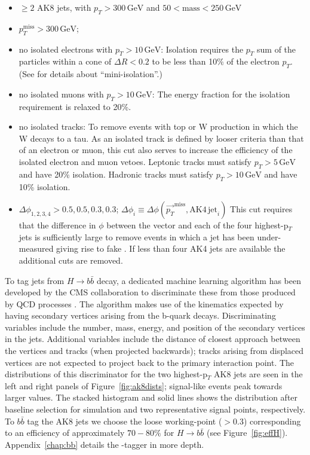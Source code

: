 \begin{itemize}
\item $\geq2$ AK8 jets, with $p_{T} > 300\,\mathrm{GeV}$ and $50 < \mathrm{mass} < 250\,\mathrm{GeV}$
\item $p_{T}^{\mathrm{miss}} > 300\,\mathrm{GeV}$;
\item no isolated electrons with $p_{T}>10\,\textrm{GeV}$:\newline
Isolation requires the $p_{T}$ sum of the particles within a cone of $\Delta R < 0.2$ to be less than 10\% of the electron $p_{T}$. (See \cite{miniiso} for details about ``mini-isolation''.)
\item no isolated muons with $p_{T}>10\,\textrm{GeV}$:\newline
The energy fraction for the isolation requirement is relaxed to 20\%.
\item no isolated tracks:\newline
To remove events with top or W production in which the W decays to a tau. As an isolated track is defined by looser criteria than that of an electron or muon, this cut also serves to increase the efficiency of the isolated electron and muon vetoes. Leptonic tracks must satisfy $p_{T}>5\,\textrm{GeV}$ and have 20\% isolation. Hadronic tracks must satisfy $p_{T}>10\,\textrm{GeV}$ and have 10\% isolation.
\item $\Delta\phi_{1, 2, 3, 4} > 0.5, 0.5, 0.3, 0.3$; $\Delta\phi_{i}\equiv \Delta\phi(\vec{p_{T}}^{\mathrm{miss}}, \mathrm{AK4\,jet}_{i})$\newline
This cut requires that the difference in $\phi$ between the \ptmiss vector and each of the four highest-p$_{T}$ jets is sufficiently large to remove events in which a jet has been under-measured giving rise to fake \ptmiss. If less than four AK4 jets are available the additional cuts are removed.
\end{itemize}

To tag jets from $H \rightarrow b\bar{b}$ decay, a dedicated machine learning algorithm has been developed by the CMS collaboration to discriminate these from those produced by QCD processes \cite{bbtagger}. The algorithm makes use of the kinematics expected by having secondary vertices arising from the b-quark decays. Discriminating variables include the number, mass, energy, and position of the secondary vertices in the jets. Additional variables include the distance of closest approach between the vertices and tracks (when projected backwards); tracks arising from displaced vertices are not expected to project back to the primary interaction point. The distributions of this discriminator for the two highest-p$_{T}$ AK8 jets are seen in the left and right panels of Figure~\ref{fig:ak8dists}; signal-like events peak towards larger values. The stacked histogram and solid lines shows the distribution after baseline selection for simulation and two representative signal points, respectively. To $b\bar{b}$ tag the AK8 jets we choose the loose working-point ($>$0.3) corresponding to an efficiency of approximately $70-80\%$ for $H \rightarrow b \bar{b}$ (see Figure~\ref{fig:effH}). Appendix~\ref{chap:bb} details the \bbbar-tagger in more depth. 

